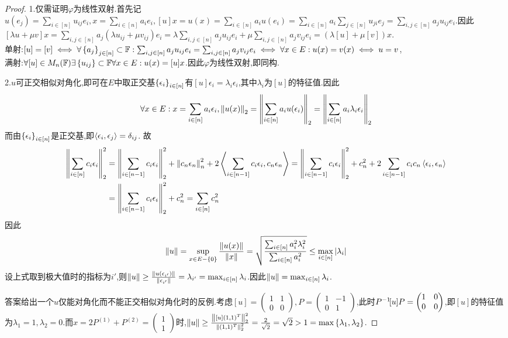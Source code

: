 \documentclass[UTF8]{article}
\begin{document}
\begin{proof}
    1.仅需证明$\varphi$为线性双射.首先记$u(e_j)=\sum_{i\in [n]}u_{ij}e_i,x=\sum_{i\in [n]}a_ie_i,[u]x=u(x)=\sum_{i\in [n]}a_iu(e_i)=\sum_{i\in [n]}a_i\sum_{j\in [n]}u_{ji}e_j=\sum_{i,j\in [n]}a_ju_{ij}e_i$.因此$[\lambda u+\mu v]x=\sum_{i,j\in [n]}a_j(\lambda u_{ij}+\mu v_{ij})e_i=\lambda\sum_{i,j\in [n]}a_ju_{ij}e_i+\mu\sum_{i,j\in [n]}a_jv_{ij}e_i=(\lambda [u]+\mu [v])x$.\\
    单射:$[u]=[v]\iff \forall \left\{a_j\right\}_{j\in [n]}\subset \mathbb{F}:\sum_{i,j\in [n]}a_ju_{ij}e_i=\sum_{i,j\in [n]}a_jv_{ij}e_i\iff \forall x\in E:u(x)=v(x)\iff u=v$,\\
    满射:$\forall [u]\in M_n(\mathbb{F})\exists \left\{u_{ij}\right\}\subset \mathbb{F}\forall x\in E:u(x)=[u]x$.因此$\varphi$为线性双射,即同构.

    2.$u$可正交相似对角化,即可在$E$中取正交基$\left\{\epsilon_i\right\}_{i\in [n]}$有$[u]\epsilon_i=\lambda_i\epsilon_i$,其中$\lambda_i$为$[u]$的特征值.因此$$\forall x\in E:x=\sum_{i\in [n]}a_i\epsilon_i, \left\|u(x)\right\|_2=\left\|\sum_{i\in [n]}a_iu(\epsilon_i)\right\|_2=\left\|\sum_{i\in [n]}a_i\lambda_i\epsilon_i\right\|_2$$
    而由$\left\{\epsilon_i\right\}_{i\in [n]}$是正交基,即$\left<\epsilon_i,\epsilon_j\right>=\delta_{ij}$.
    故$$\begin{aligned}
        \left\|\sum_{i\in [n]}c_i\epsilon_i\right\|^2_2&=\left\|\sum_{i\in [n-1]}c_i\epsilon_i\right\|^2_2+\left\|c_n\epsilon_n\right\|^2_n+2\left<\sum_{i\in [n-1]}c_i\epsilon_i,c_n\epsilon_n\right>=\left\|\sum_{i\in [n-1]}c_i\epsilon_i\right\|^2_2+c_n^2+2\sum_{i\in [n-1]}c_ic_n\left<\epsilon_i,\epsilon_n\right>\\
        &=\left\|\sum_{i\in [n-1]}c_i\epsilon_i\right\|^2_2+c_n^2=\sum_{i\in [n]}c_n^2
    \end{aligned}$$
    因此$$\left\|u\right\|=\sup_{x\in E-\left\{0\right\}}\frac{\left\|u(x)\right\|}{\left\|x\right\|}=\sqrt{\frac{\sum_{i\in [n]}a_i^2\lambda_i^2}{\sum_{i\in [n]}a_i^2}}\leq \max_{i\in [n]}\left|\lambda_i\right|$$
    设上式取到极大值时的指标为$i'$,则$\left\|u\right\|\geq \frac{\left\|u(\epsilon_{i'})\right\|}{\left\|\epsilon_{i'}\right\|}=\lambda_{i'}=\max_{i\in [n]}\lambda_i$.因此$\left\|u\right\|=\max_{i\in [n]}\lambda_i$.

    {\small 答案给出一个$u$仅能对角化而不能正交相似对角化时的反例.考虑$[u]=\begin{pmatrix}1&1\\0&0\end{pmatrix},P=\begin{pmatrix}1&-1\\0&1\end{pmatrix}$,此时$P^{-1}\! [u]P=\begin{pmatrix}1&0\\0&0\end{pmatrix}$,即$[u]$的特征值为$\lambda_1=1,\lambda_2=0$.而$x=2P^{(1)}+P^{(2)}=\begin{pmatrix}1\\1\end{pmatrix}$时,$\left\|u\right\|\geq \frac{\left\|[u](1,1)^T\right\|^2_2}{\left\|(1,1)^T\right\|^2_2}=\frac{2}{\sqrt{2}}=\sqrt{2}>1=\max\left\{\lambda_1,\lambda_2\right\}$.}


\end{proof}
\end{document}

